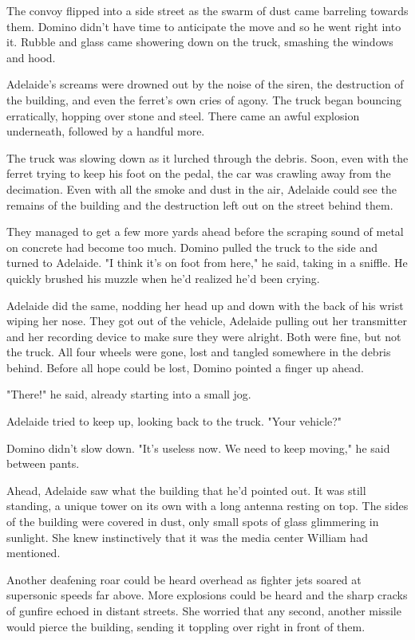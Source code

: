 The convoy flipped into a side street as the swarm of dust came barreling towards them. Domino didn't have time to anticipate the move and so he went right into it. Rubble and glass came showering down on the truck, smashing the windows and hood.

Adelaide's screams were drowned out by the noise of the siren, the destruction of the building, and even the ferret's own cries of agony. The truck began bouncing erratically, hopping over stone and steel. There came an awful explosion underneath, followed by a handful more.

The truck was slowing down as it lurched through the debris. Soon, even with the ferret trying to keep his foot on the pedal, the car was crawling away from the decimation. Even with all the smoke and dust in the air, Adelaide could see the remains of the building and the destruction left out on the street behind them.

They managed to get a few more yards ahead before the scraping sound of metal on concrete had become too much. Domino pulled the truck to the side and turned to Adelaide. "I think it's on foot from here," he said, taking in a sniffle. He quickly brushed his muzzle when he'd realized he'd been crying.

Adelaide did the same, nodding her head up and down with the back of his wrist wiping her nose. They got out of the vehicle, Adelaide pulling out her transmitter and her recording device to make sure they were alright. Both were fine, but not the truck. All four wheels were gone, lost and tangled somewhere in the debris behind. Before all hope could be lost, Domino pointed a finger up ahead.

"There!" he said, already starting into a small jog.

Adelaide tried to keep up, looking back to the truck. "Your vehicle?"

Domino didn't slow down. "It's useless now. We need to keep moving," he said between pants.

Ahead, Adelaide saw what the building that he'd pointed out. It was still standing, a unique tower on its own with a long antenna resting on top. The sides of the building were covered in dust, only small spots of glass glimmering in sunlight. She knew instinctively that it was the media center William had mentioned.

Another deafening roar could be heard overhead as fighter jets soared at supersonic speeds far above. More explosions could be heard and the sharp cracks of gunfire echoed in distant streets. She worried that any second, another missile would pierce the building, sending it toppling over right in front of them.


